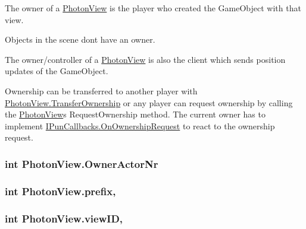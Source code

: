 The owner of a \hyperlink{class_photon_view}{Photon\+View} is the player who created the Game\+Object with that view. 

Objects in the scene don\textquotesingle{}t have an owner. 

The owner/controller of a \hyperlink{class_photon_view}{Photon\+View} is also the client which sends position updates of the Game\+Object.

Ownership can be transferred to another player with \hyperlink{class_photon_view_a484df6eca8208330c00c317334dd8115}{Photon\+View.\+Transfer\+Ownership} or any player can request ownership by calling the \hyperlink{class_photon_view}{Photon\+View}\textquotesingle{}s Request\+Ownership method. The current owner has to implement \hyperlink{interface_i_pun_callbacks_a02364f5144b6305bbffc886d530b7bd2}{I\+Pun\+Callbacks.\+On\+Ownership\+Request} to react to the ownership request. 
\subsubsection[{\texorpdfstring{Owner\+Actor\+Nr}{OwnerActorNr}}]{\setlength{\rightskip}{0pt plus 5cm}int Photon\+View.\+Owner\+Actor\+Nr\hspace{0.3cm}{\ttfamily [get]}}\hypertarget{class_photon_view_a535e478c9fe2fce6af7102e32833135a}{}\label{class_photon_view_a535e478c9fe2fce6af7102e32833135a}
\subsubsection[{\texorpdfstring{prefix}{prefix}}]{\setlength{\rightskip}{0pt plus 5cm}int Photon\+View.\+prefix\hspace{0.3cm}{\ttfamily [get]}, {\ttfamily [set]}}\hypertarget{class_photon_view_aae1e4dcb7cf0cf2cd460490cefdcda46}{}\label{class_photon_view_aae1e4dcb7cf0cf2cd460490cefdcda46}
\subsubsection[{\texorpdfstring{view\+ID}{viewID}}]{\setlength{\rightskip}{0pt plus 5cm}int Photon\+View.\+view\+ID\hspace{0.3cm}{\ttfamily [get]}, {\ttfamily [set]}}\hypertarget{class_photon_view_a309ddedb443400696cf80da2ff579262}{}\label{class_photon_view_a309ddedb443400696cf80da2ff579262}


